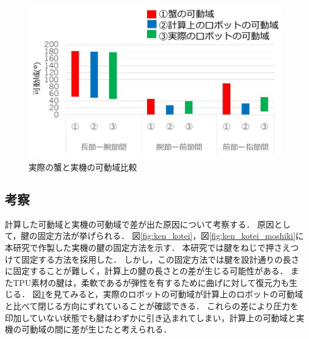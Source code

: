 %
\begin{table}[!ht]
    \centering
    \vspace{-2mm}
    \caption{実際の蟹と実機の可動域比較}
    \vspace{1mm}
    \label{tab:kadouiki}
\end{table}
%
\begin{figure}
    \centering
    \includegraphics[scale=0.6]{image/kadouiki_graph.jpg}
    \caption{実際の蟹と実機の可動域比較}
    \label{fig:kadouiki_graph}
\end{figure}
\clearpage
\subsection{考察}
計算した可動域と実機の可動域で差が出た原因について考察する．
原因として，腱の固定方法が挙げられる．
図\ref{fig:ken_kotei}，図\ref{fig:ken_kotei_moshiki}に本研究で作製した実機の腱の固定方法を示す．
本研究では腱をねじで押さえつけて固定する方法を採用した．
しかし，この固定方法では腱を設計通りの長さに固定することが難しく，計算上の腱の長さとの差が生じる可能性がある．
またTPU素材の腱は，柔軟であるが弾性を有するために曲げに対して復元力も生じる．
図\ref{fig:kadouiki_graph}を見てみると，実際のロボットの可動域が計算上のロボットの可動域と比べて閉じる方向にずれていることが確認できる．
これらの差により圧力を印加していない状態でも腱はわずかに引き込まれてしまい，計算上の可動域と実機の可動域の間に差が生じたと考えられる．

